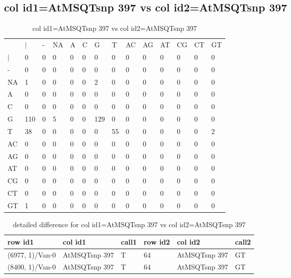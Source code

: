 \subsection{col id1=AtMSQTsnp 397 vs col id2=AtMSQTsnp 397}
\begin{center}
\begin{longtable}{|l|l|l|l|l|l|l|l|l|l|l|l|l|l|}
\caption{col id1=AtMSQTsnp 397 vs col id2=AtMSQTsnp 397} \label{table_dm910}\\
\hline
\\
\hline
&$|$&-&NA&A&C&G&T&AC&AG&AT&CG&CT&GT\\
$|$&0&0&0&0&0&0&0&0&0&0&0&0&0\\
-&0&0&0&0&0&0&0&0&0&0&0&0&0\\
NA&1&0&0&0&0&2&0&0&0&0&0&0&0\\
A&0&0&0&0&0&0&0&0&0&0&0&0&0\\
C&0&0&0&0&0&0&0&0&0&0&0&0&0\\
G&110&0&5&0&0&129&0&0&0&0&0&0&0\\
T&38&0&0&0&0&0&55&0&0&0&0&0&2\\
AC&0&0&0&0&0&0&0&0&0&0&0&0&0\\
AG&0&0&0&0&0&0&0&0&0&0&0&0&0\\
AT&0&0&0&0&0&0&0&0&0&0&0&0&0\\
CG&0&0&0&0&0&0&0&0&0&0&0&0&0\\
CT&0&0&0&0&0&0&0&0&0&0&0&0&0\\
GT&1&0&0&0&0&0&0&0&0&0&0&0&0\\
\hline
\end{longtable}
\end{center}

\begin{center}
\begin{longtable}{|l|l|l|l|l|l|}
\caption{detailed difference for col id1=AtMSQTsnp 397 vs col id2=AtMSQTsnp 397} \label{table_dm911}\\
\hline
row id1&col id1&call1&row id2&col id2&call2\\
\hline
(6977, 1)/Van-0&AtMSQTsnp 397&T&64&AtMSQTsnp 397&GT\\
(8400, 1)/Van-0&AtMSQTsnp 397&T&64&AtMSQTsnp 397&GT\\
\hline
\end{longtable}
\end{center}

